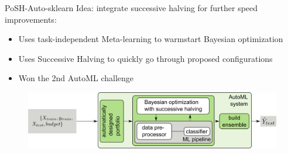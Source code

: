 \begin{frame}[c]{PoSH-Auto-sklearn} 
Idea: integrate successive halving for further speed improvements:
\begin{itemize}
    \item Uses task-independent Meta-learning to warmstart Bayesian optimization
    \item Uses Successive Halving to quickly go through proposed configurations
    \item Won the 2nd AutoML challenge
\end{itemize}

\begin{figure}
    \centering
    \includegraphics[width=\textwidth]{images/success_stories/automl_bo_po_es.png}
\end{figure}

\end{frame}

